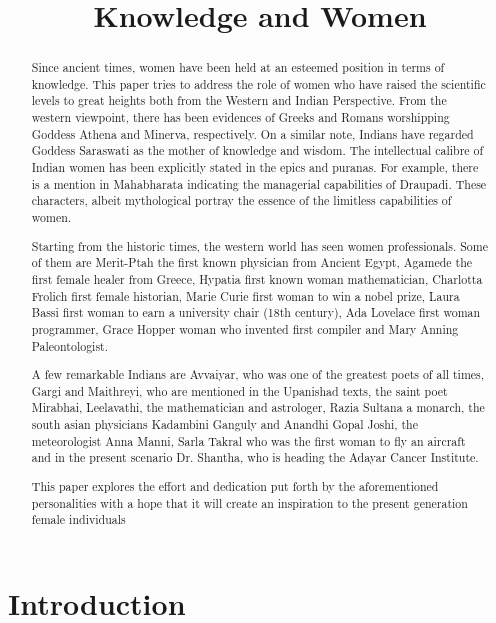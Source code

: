 \documentclass[a4paper,10pt]{article}
\title{Knowledge and Women}
\author{}
\begin{document}
\maketitle

\begin{abstract}
Since ancient times, women have been held at an esteemed position in terms of knowledge. This paper tries to address the role of women who have raised the scientific levels to great heights both from the Western and Indian Perspective. From the western viewpoint,  there has been evidences of Greeks and Romans worshipping Goddess Athena and Minerva, respectively. On a similar note, Indians have regarded Goddess Saraswati as the mother of knowledge and wisdom. The intellectual calibre of Indian women has been explicitly stated in the epics and puranas. For example, there is a mention in Mahabharata indicating the managerial capabilities of Draupadi. These characters, albeit mythological portray the essence of the limitless capabilities of women.

Starting from the historic times, the western world has seen women professionals. Some of them are Merit-Ptah the first known physician from Ancient Egypt, Agamede the first female healer from Greece, Hypatia first known woman mathematician, Charlotta Frolich first female historian,  Marie Curie first woman to win a nobel prize, Laura Bassi first woman to earn a university chair (18th century),  Ada Lovelace first woman programmer, Grace Hopper woman who invented first compiler and Mary Anning Paleontologist.

A few remarkable Indians are Avvaiyar, who was one of the greatest poets of all times,  Gargi and Maithreyi, who are mentioned in the Upanishad texts,  the saint poet Mirabhai, Leelavathi, the mathematician and astrologer, Razia Sultana a monarch, the south asian physicians Kadambini Ganguly and Anandhi Gopal Joshi, the meteorologist Anna Manni, Sarla Takral who was the first woman to fly an aircraft and in the present scenario Dr. Shantha, who is heading the Adayar Cancer Institute. 

This paper explores the effort and dedication put forth by the aforementioned personalities with a hope that it will create an inspiration to the present generation female individuals
\end{abstract}
\section{Introduction}
\end{document}
